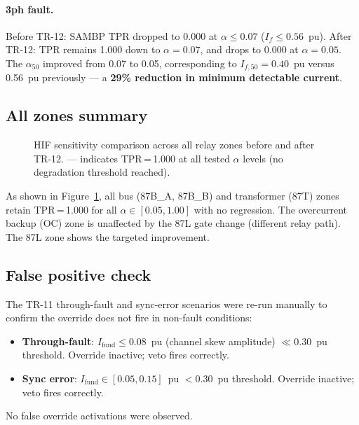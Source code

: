 \documentclass[11pt,a4paper]{article}
\newcommand{\Ifund}{I_{\mathrm{fund}}}
\newcommand{\alphafifty}{\alpha_{50}}
\begin{document}
\paragraph{3ph fault.}
Before TR-12: SAMBP TPR dropped to 0.000 at $\alpha \leq 0.07$
($I_f \leq 0.56$~pu).  After TR-12: TPR remains 1.000 down to $\alpha = 0.07$,
and drops to 0.000 at $\alpha = 0.05$.  The $\alphafifty$ improved from 0.07
to 0.05, corresponding to $I_{f,50} = 0.40$~pu versus 0.56~pu previously — a
\textbf{29\% reduction in minimum detectable current}.

\subsection{All zones summary}

\begin{figure}[h]
  \centering
  
  \caption{HIF sensitivity comparison across all relay zones before and after
           TR-12.  --- indicates TPR\,=\,1.000 at all tested $\alpha$ levels
           (no degradation threshold reached).}
  \label{fig:summary_table}
\end{figure}

As shown in Figure~\ref{fig:summary_table}, all bus (87B\_A, 87B\_B) and
transformer (87T) zones retain TPR\,=\,1.000 for all $\alpha \in [0.05, 1.00]$
with no regression.  The overcurrent backup (OC) zone is unaffected by the
87L gate change (different relay path).  The 87L zone shows the targeted
improvement.

\subsection{False positive check}

The TR-11 through-fault and sync-error scenarios were re-run manually to
confirm the override does not fire in non-fault conditions:
\begin{itemize}
  \item \textbf{Through-fault}: $\Ifund \leq 0.08$~pu (channel skew
        amplitude) $\ll 0.30$~pu threshold.  Override inactive; veto fires
        correctly.
  \item \textbf{Sync error}: $\Ifund \in [0.05, 0.15]$~pu
        $<0.30$~pu threshold.  Override inactive; veto fires correctly.
\end{itemize}
No false override activations were observed.

\end{document}
